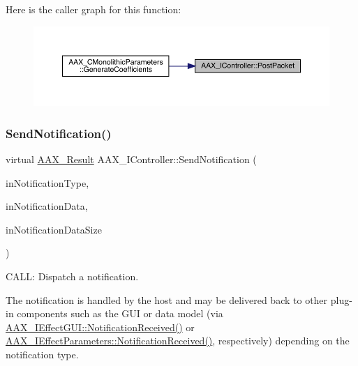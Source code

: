 Here is the caller graph for this function\+:
\nopagebreak
\begin{figure}[H]
\begin{center}
\leavevmode
\includegraphics[width=350pt]{a01789_ae5dd2b5925dbc181513bca1c4ac5e716_icgraph}
\end{center}
\end{figure}
\mbox{\label{a01789_a0384f820cecf8cf7671057060bf5ba4f}} 
\subsubsection{\texorpdfstring{SendNotification()}{SendNotification()}\hspace{0.1cm}{\footnotesize\ttfamily [1/2]}}
{\footnotesize\ttfamily virtual \mbox{\hyperlink{a00392_a4d8f69a697df7f70c3a8e9b8ee130d2f}{A\+A\+X\+\_\+\+Result}} A\+A\+X\+\_\+\+I\+Controller\+::\+Send\+Notification (\begin{DoxyParamCaption}\item[{\mbox{\hyperlink{a00392_ac678f9c1fbcc26315d209f71a147a175}{A\+A\+X\+\_\+\+C\+Type\+ID}}}]{in\+Notification\+Type,  }\item[{const void $\ast$}]{in\+Notification\+Data,  }\item[{uint32\+\_\+t}]{in\+Notification\+Data\+Size }\end{DoxyParamCaption})\hspace{0.3cm}{\ttfamily [pure virtual]}}



C\+A\+LL\+: Dispatch a notification. 

The notification is handled by the host and may be delivered back to other plug-\/in components such as the G\+UI or data model (via \mbox{\hyperlink{a01665_a11a15162cb3c7019d1fabf2994fba6c6}{A\+A\+X\+\_\+\+I\+Effect\+G\+U\+I\+::\+Notification\+Received()}} or \mbox{\hyperlink{a01669_aa3eaeb292d2ca84086a5a058171994fd}{A\+A\+X\+\_\+\+I\+Effect\+Parameters\+::\+Notification\+Received()}}, respectively) depending on the notification type.

